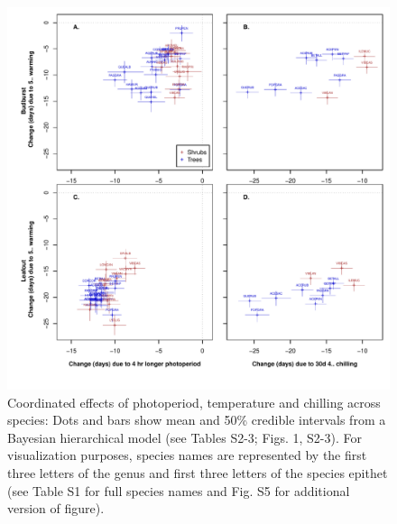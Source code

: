 \documentclass[11pt]{article}
\begin{document}
\newpage
\begin{figure}[h!]
\centering
\noindent \includegraphics[width=1\textwidth]{images/Fig2_4panel.pdf}
\caption{Coordinated effects of photoperiod, temperature and chilling across species: Dots and bars show mean and 50\% credible intervals from a Bayesian hierarchical model (see Tables S2-3; Figs. 1, S2-3). For visualization purposes, species names are represented by the first three letters of the genus and first three letters of the species epithet (see Table S1 for full species names and Fig. S5 for additional version of figure).}
\label{fig:sppeff}
\end{figure}
\end{document}
